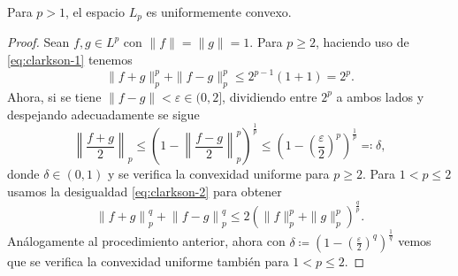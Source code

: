 \begin{corollary}
    Para $ p > 1 $, el espacio $ L_p $ es uniformemente convexo.
\end{corollary}
\begin{proof}
    Sean $ f, g \in L^p $ con $ \|f\| = \|g\| = 1 $. Para $ p \geq 2 $, haciendo uso de \eqref{eq:clarkson-1} tenemos
    \begin{equation}
        \| f + g \|_p^p + \| f - g \|_p^p \leq 2^{p-1}(1 + 1) = 2^p.
    \end{equation}
    Ahora, si se tiene $\|f-g\| < \varepsilon \in (0, 2] $, dividiendo entre $ 2^p $ a ambos lados y despejando adecuadamente se sigue
    \begin{equation}
        \left\| \frac{f + g}{2} \right\|_p \leq \left( 1 - \left\| \frac{f - g}{2} \right\|_p^p\right)^{\frac{1}{p}} \leq \left( 1 - \left( \frac{\varepsilon}{2} \right)^p\right)^{\frac{1}{p}} \eqcolon \delta,
    \end{equation}
    donde $ \delta \in (0, 1) $ y se verifica la convexidad uniforme para $ p \geq 2 $. Para $ 1 < p \leq 2 $ usamos la desigualdad \eqref{eq:clarkson-2} para obtener
    \begin{equation}
        \left\| f + g \right\|_p^q + \left\| f - g \right\|_p^q \leq 2 \left(\|f \|_p^p + \|g\|_p^p \right)^{\frac{q}{p}}.
    \end{equation}
    Análogamente al procedimiento anterior, ahora con $ \delta \coloneq  \left( 1 - \left( \frac{\varepsilon}{2} \right)^q\right)^{\frac{1}{q}} $ vemos que se verifica la convexidad uniforme también para $ 1 < p \leq 2 $.
\end{proof}

